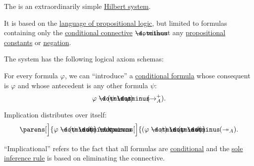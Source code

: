 \begin{definition}\label{def:implicational_propositional_hilbert_system}
  The  is an extraordinarily simple \hyperref[def:axiomatic_deductive_system]{Hilbert system}.

  It is based on the \hyperref[def:propositional_alphabet]{language of propositional logic}, but limited to formulas containing only the \hyperref[def:propositional_alphabet/connectives/conditional]{conditional connective} \( \synimplies \), without any \hyperref[def:propositional_alphabet/constants]{propositional constants} or \hyperref[def:propositional_alphabet/negation]{negation}.

  The system has the following logical axiom schemas:
  \begin{thmenum}
     For every formula \( \varphi \), we can \enquote{introduce} a \hyperref[def:conditional_formula]{conditional formula} whose consequent is \( \varphi \) and whose antecedent is any other formula \( \psi \):
    \begin{equation}\label{eq:def:implicational_propositional_hilbert_system/intro}
      \varphi \synimplies (\psi \synimplies \varphi) \tag{\( \rightarrow_A^+ \)}.
    \end{equation}

     Implication distributes over itself:
    \begin{equation}\label{eq:def:implicational_propositional_hilbert_system/trans}
      \parens[\Big]{ \varphi \synimplies (\psi \synimplies \theta) } \synimplies \parens[\Big]{ (\varphi \synimplies \psi) \synimplies (\varphi \synimplies \theta)} \tag{\( \twoheadrightarrow_A \)}.
    \end{equation}
  \end{thmenum}
\end{definition}
\begin{comments}
  \item \enquote{Implicational} refers to the fact that all formulas are \hyperref[def:propositional_alphabet/connectives/conditional]{conditional} and the \hyperref[eq:def:def:axiomatic_deductive_system/mp]{sole inference rule} is based on eliminating the connective.
\end{comments}

